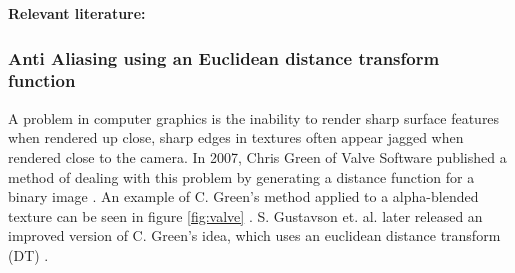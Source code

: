 \documentclass{article}
\begin{document}
\vspace{5mm}
\noindent \textbf{Relevant literature:}
\cite{hoare1962quicksort}
\cite{sanders1997efficient}
\cite{manca2016cuda}

\subsubsection{Anti Aliasing using an Euclidean distance transform function}
A problem in computer graphics is the inability to render sharp surface features when rendered up close, sharp edges in textures often appear jagged when rendered close to the camera. In 2007, Chris Green of Valve Software published a method of dealing with this problem by generating a distance function for a binary image \cite{green2007improved}. An example of C. Green's method applied to a  alpha-blended texture can be seen in figure \ref{fig:valve} \cite{green2007improved}. S. Gustavson et. al. later released an improved version of C. Green's idea, which uses an euclidean distance transform (DT) \cite{gustavson2011anti}\cite{gustavson20122d}. 
\end{document}
